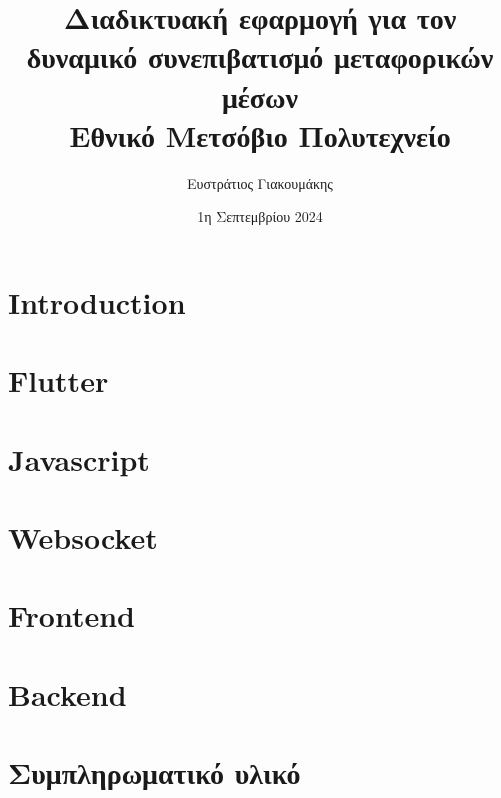 \documentclass{report}
\title{
    {Διαδικτυακή εφαρμογή για τον δυναμικό συνεπιβατισμό μεταφορικών μέσων}\\
    {\large Εθνικό Μετσόβιο Πολυτεχνείο}
}
\author{Ευστράτιος Γιακουμάκης}
\date{1η Σεπτεμβρίου 2024}
\begin{document}
\maketitle

\tableofcontents

\chapter{Introduction}

\chapter{Flutter}


\chapter{Javascript}


\chapter{Websocket}

\chapter{Frontend}


\chapter{Backend}


\appendix
\chapter{Συμπληρωματικό υλικό}

\end{document}
